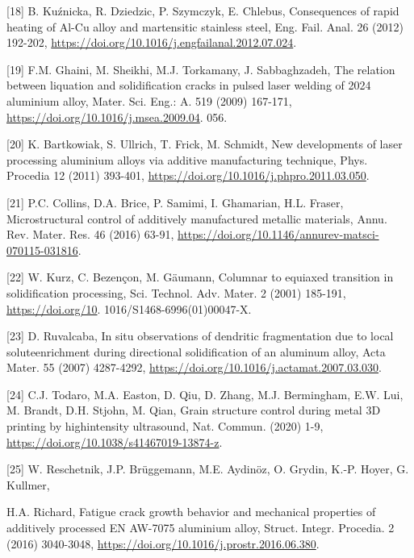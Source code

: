 \documentclass[10pt]{article}
\begin{document}
[18] B. Kuźnicka, R. Dziedzic, P. Szymczyk, E. Chlebus, Consequences of rapid heating of Al-Cu alloy and martensitic stainless steel, Eng. Fail. Anal. 26 (2012) 192-202, \href{https://doi.org/10.1016/j.engfailanal.2012.07.024}{https://doi.org/10.1016/j.engfailanal.2012.07.024}.

[19] F.M. Ghaini, M. Sheikhi, M.J. Torkamany, J. Sabbaghzadeh, The relation between liquation and solidification cracks in pulsed laser welding of 2024 aluminium alloy, Mater. Sci. Eng.: A. 519 (2009) 167-171, \href{https://doi.org/10.1016/j.msea.2009.04}{https://doi.org/10.1016/j.msea.2009.04}. 056.

[20] K. Bartkowiak, S. Ullrich, T. Frick, M. Schmidt, New developments of laser processing aluminium alloys via additive manufacturing technique, Phys. Procedia 12 (2011) 393-401, \href{https://doi.org/10.1016/j.phpro.2011.03.050}{https://doi.org/10.1016/j.phpro.2011.03.050}.

[21] P.C. Collins, D.A. Brice, P. Samimi, I. Ghamarian, H.L. Fraser, Microstructural control of additively manufactured metallic materials, Annu. Rev. Mater. Res. 46 (2016) 63-91, \href{https://doi.org/10.1146/annurev-matsci-070115-031816}{https://doi.org/10.1146/annurev-matsci-070115-031816}.

[22] W. Kurz, C. Bezençon, M. Gäumann, Columnar to equiaxed transition in solidification processing, Sci. Technol. Adv. Mater. 2 (2001) 185-191, \href{https://doi.org/10}{https://doi.org/10}. 1016/S1468-6996(01)00047-X.

[23] D. Ruvalcaba, In situ observations of dendritic fragmentation due to local soluteenrichment during directional solidification of an aluminum alloy, Acta Mater. 55 (2007) 4287-4292, \href{https://doi.org/10.1016/j.actamat.2007.03.030}{https://doi.org/10.1016/j.actamat.2007.03.030}.

[24] C.J. Todaro, M.A. Easton, D. Qiu, D. Zhang, M.J. Bermingham, E.W. Lui, M. Brandt, D.H. Stjohn, M. Qian, Grain structure control during metal 3D printing by highintensity ultrasound, Nat. Commun. (2020) 1-9, \href{https://doi.org/10.1038/s41467019-13874-z}{https://doi.org/10.1038/s41467019-13874-z}.

[25] W. Reschetnik, J.P. Brüggemann, M.E. Aydinöz, O. Grydin, K.-P. Hoyer, G. Kullmer,

H.A. Richard, Fatigue crack growth behavior and mechanical properties of additively processed EN AW-7075 aluminium alloy, Struct. Integr. Procedia. 2 (2016) 3040-3048, \href{https://doi.org/10.1016/j.prostr.2016.06.380}{https://doi.org/10.1016/j.prostr.2016.06.380}.
\end{document}
